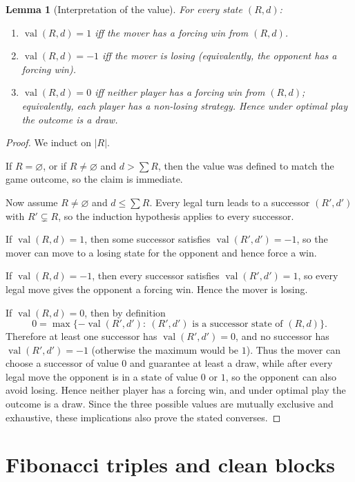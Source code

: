 \documentclass[11pt]{article}
\newtheorem{lemma}[theorem]{Lemma}
\newcommand{\val}{\operatorname{val}}
\begin{document}
\begin{lemma}[Interpretation of the value]\label{lem:value-meaning}
For every state $(R,d)$:
\begin{enumerate}
\item $\val(R,d)=1$ iff the mover has a forcing win from $(R,d)$.
\item $\val(R,d)=-1$ iff the mover is losing (equivalently, the opponent has a forcing win).
\item $\val(R,d)=0$ iff neither player has a forcing win from $(R,d)$;
equivalently, each player has a non-losing strategy. Hence under optimal play the outcome is a draw.
\end{enumerate}
\end{lemma}

\begin{proof}
We induct on $|R|$.

If $R=\varnothing$, or if $R\neq\varnothing$ and $d>\sum R$, then the value was defined to
match the game outcome, so the claim is immediate.

Now assume $R\neq\varnothing$ and $d\le \sum R$. Every legal turn leads to a successor
$(R',d')$ with $R'\subsetneq R$, so the induction hypothesis applies to every successor.

If $\val(R,d)=1$, then some successor satisfies $\val(R',d')=-1$, so the mover can move to
a losing state for the opponent and hence force a win.

If $\val(R,d)=-1$, then every successor satisfies $\val(R',d')=1$, so every legal move gives
the opponent a forcing win. Hence the mover is losing.

If $\val(R,d)=0$, then by definition
\[
0=\max\{-\val(R',d'):\ (R',d')\text{ is a successor state of }(R,d)\}.
\]
Therefore at least one successor has $\val(R',d')=0$, and no successor has
$\val(R',d')=-1$ (otherwise the maximum would be $1$). Thus the mover can choose a
successor of value $0$ and guarantee at least a draw, while after every legal move the
opponent is in a state of value $0$ or $1$, so the opponent can also avoid losing.
Hence neither player has a forcing win, and under optimal play the outcome is a draw.
Since the three possible values are mutually exclusive and exhaustive, these implications also prove the stated converses.
\end{proof}

\section{Fibonacci triples and clean blocks}
\end{document}
